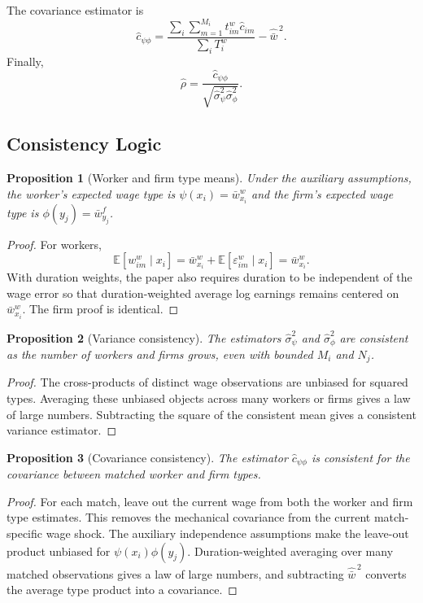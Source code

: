 \documentclass[11pt]{article}
\newtheorem{proposition}{Proposition}
\newcommand{\E}{\mathbb{E}}
\begin{document}
The covariance estimator is
\[
  \widehat c_{\psi\phi}
  =
  \frac{\sum_i\sum_{m=1}^{M_i}t^w_{im}\widehat c_{im}}
  {\sum_i T_i^w}
  -
  \widehat{\bar w}^{\,2}.
\]
Finally,
\[
  \widehat\rho
  =
  \frac{\widehat c_{\psi\phi}}
  {\sqrt{\widehat\sigma_\psi^2\widehat\sigma_\phi^2}}.
\]

\subsection{Consistency Logic}

\begin{proposition}[Worker and firm type means]
Under the auxiliary assumptions, the worker's expected wage type is $\psi(x_i)=\bar w^w_{x_i}$ and the firm's expected wage type is $\phi(y_j)=\bar w^f_{y_j}$.
\end{proposition}

\begin{proof}
For workers,
\[
  \E[w^w_{im}\mid x_i]
  =
  \bar w^w_{x_i}+\E[\varepsilon^w_{im}\mid x_i]
  =
  \bar w^w_{x_i}.
\]
With duration weights, the paper also requires duration to be independent of the wage error so that duration-weighted average log earnings remains centered on $\bar w^w_{x_i}$. The firm proof is identical.
\end{proof}

\begin{proposition}[Variance consistency]
The estimators $\widehat\sigma_\psi^2$ and $\widehat\sigma_\phi^2$ are consistent as the number of workers and firms grows, even with bounded $M_i$ and $N_j$.
\end{proposition}

\begin{proof}
The cross-products of distinct wage observations are unbiased for squared types. Averaging these unbiased objects across many workers or firms gives a law of large numbers. Subtracting the square of the consistent mean gives a consistent variance estimator.
\end{proof}

\begin{proposition}[Covariance consistency]
The estimator $\widehat c_{\psi\phi}$ is consistent for the covariance between matched worker and firm types.
\end{proposition}

\begin{proof}
For each match, leave out the current wage from both the worker and firm type estimates. This removes the mechanical covariance from the current match-specific wage shock. The auxiliary independence assumptions make the leave-out product unbiased for $\psi(x_i)\phi(y_j)$. Duration-weighted averaging over many matched observations gives a law of large numbers, and subtracting $\widehat{\bar w}^{\,2}$ converts the average type product into a covariance.
\end{proof}
\end{document}
